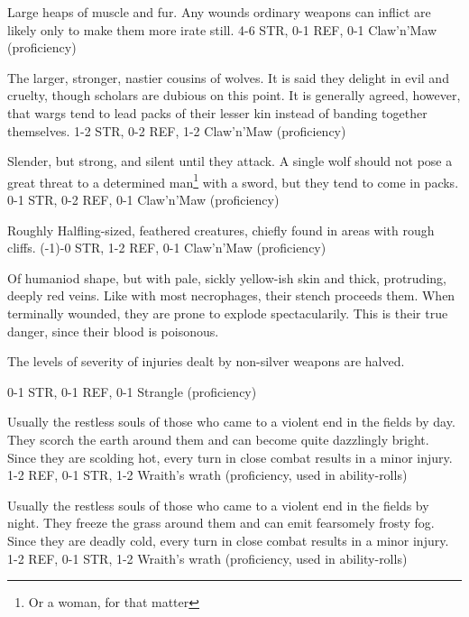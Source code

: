 {
    Large heaps of muscle and fur. Any wounds ordinary weapons can inflict are likely only to make them more irate still.
}
{
    4-6 STR, 0-1 REF, 0-1 Claw'n'Maw (proficiency)
}

{
    The larger, stronger, nastier cousins of wolves. It is said they delight in evil and cruelty, though scholars
    are dubious on this point. It is generally agreed, however, that wargs tend to lead packs of their lesser kin
    instead of banding together themselves.
}{
    1-2 STR, 0-2 REF, 1-2 Claw'n'Maw (proficiency)
}

{
    Slender, but strong, and silent until they attack. A single wolf should not pose a great threat to a determined
    man\footnote{Or a woman, for that matter} with a sword, but they tend to come in packs.
}{
    0-1 STR, 0-2 REF, 0-1 Claw'n'Maw (proficiency)
}

{
    Roughly Halfling-sized, feathered creatures, chiefly found in areas with rough cliffs.
}{
    (-1)-0 STR, 1-2 REF, 0-1 Claw'n'Maw (proficiency)
}


{
    Of humaniod shape, but with pale, sickly yellow-ish skin and thick, protruding, deeply red veins. Like
    with most necrophages, their stench proceeds them. When terminally wounded, they are prone to explode
    spectacularily. This is their true danger, since their blood is poisonous.

    The levels of severity of injuries dealt by non-silver weapons are halved.
}{
    0-1 STR, 0-1 REF, 0-1 Strangle (proficiency)
}


{
    Usually the restless souls of those who came to a violent end in the fields by day. They scorch the earth around them
    and can become quite dazzlingly bright. Since they are scolding hot, every turn in close combat results in a minor injury.
}{
    1-2 REF, 0-1 STR, 1-2 Wraith's wrath (proficiency, used in ability-rolls)
}


{
    Usually the restless souls of those who came to a violent end in the fields by night. They freeze the grass around them
    and can emit fearsomely frosty fog. Since they are deadly cold, every turn in close combat results in a minor injury.
}{
    1-2 REF, 0-1 STR, 1-2 Wraith's wrath (proficiency, used in ability-rolls)
}

